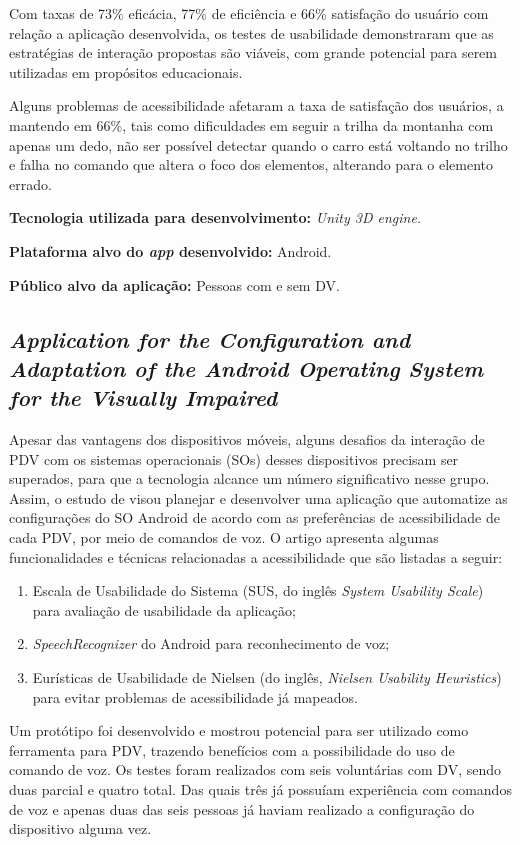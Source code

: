 Com taxas de 73\% eficácia, 77\% de eficiência e 66\% satisfação do usuário com relação a aplicação desenvolvida, os testes de usabilidade demonstraram que as estratégias de interação propostas são viáveis, com grande potencial para serem utilizadas em propósitos educacionais.

Alguns problemas de acessibilidade afetaram a taxa de satisfação dos usuários, a mantendo em 66\%, tais como dificuldades em seguir a trilha da montanha com apenas um dedo, não ser possível detectar quando o carro está voltando no trilho e falha no comando que altera o foco dos elementos, alterando para o elemento errado.

\textbf{Tecnologia utilizada para desenvolvimento:} \emph{Unity 3D engine}.

\textbf{Plataforma alvo do \emph{app} desenvolvido:} Android.

\textbf{Público alvo da aplicação:} Pessoas com e sem DV\@.

\subsection{\emph{Application for the Configuration and Adaptation of the Android Operating System for the Visually Impaired}}

Apesar das vantagens dos dispositivos móveis, alguns desafios da interação de PDV com os sistemas operacionais (SOs) desses dispositivos precisam ser superados, para que a tecnologia alcance
um número significativo nesse grupo. Assim, o estudo de  visou planejar e desenvolver uma aplicação que automatize as configurações do SO Android de acordo com
as preferências de acessibilidade de cada PDV, por meio de comandos de voz. O artigo apresenta algumas funcionalidades e técnicas relacionadas a acessibilidade que são listadas a seguir:

\begin{enumerate}
    \item Escala de Usabilidade do Sistema (SUS, do inglês \emph{System Usability Scale}) para avaliação de usabilidade da aplicação;
    \item \emph{SpeechRecognizer} do Android para reconhecimento de voz;
    \item Eurísticas de Usabilidade de Nielsen (do inglês, \emph{Nielsen Usability Heuristics}) para evitar problemas de acessibilidade já mapeados.
\end{enumerate}

Um protótipo foi desenvolvido e mostrou potencial para ser utilizado como ferramenta para PDV, trazendo benefícios com a possibilidade do uso de comando de voz.
Os testes foram realizados com seis voluntárias com DV, sendo duas parcial e quatro total.
Das quais três já possuíam experiência com comandos de voz e apenas duas das seis pessoas já haviam realizado a configuração do dispositivo alguma vez.

